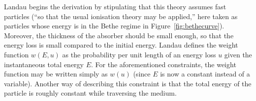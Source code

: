 \label{apx:landau}

Landau \cite{landau} begins the derivation by stipulating that this theory assumes fast particles (``so that the usual ionisation theory may be applied,'' here taken as particles whose energy is in the Bethe regime in Figure~\ref{fig:bethecurve}). Moreover, the thickness of the absorber should be small enough, so that the energy loss is small compared to the initial energy. Landau defines the weight function $w(E,u)$ as the probability per unit length of an energy loss $u$ given the instantaneous total energy $E$. For the aforementioned constraints, the weight function may be written simply as $w(u)$ (since $E$ is now a constant instead of a variable). Another way of describing this constraint is that the total energy of the particle is roughly constant while traversing the medium.

